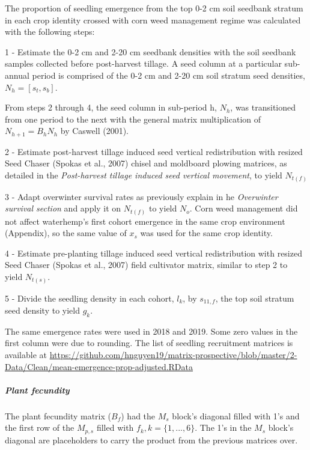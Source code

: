 \documentclass[
]{article}
\begin{document}
The proportion of seedling emergence from the top 0-2 cm soil seedbank stratum in each crop identity crossed with corn weed management regime was calculated with the following steps:

1 - Estimate the 0-2 cm and 2-20 cm seedbank densities with the soil seedbank samples collected before post-harvest tillage. A seed column at a particular sub-annual period is comprised of the 0-2 cm and 2-20 cm soil stratum seed densities, \(N_h = [s_t, s_b]\).

From steps 2 through 4, the seed column in sub-period h, \(N_h\), was transitioned from one period to the next with the general matrix multiplication of \(N_{h+1} = B_hN_h\) by Caswell (2001).

2 - Estimate post-harvest tillage induced seed vertical redistribution with resized Seed Chaser (Spokas et al., 2007) chisel and moldboard plowing matrices, as detailed in the \emph{Post-harvest tillage induced seed vertical movement}, to yield \(N_{t(f)}\)

3 - Adapt overwinter survival rates as previously explain in he \emph{Overwinter survival section} and apply it on \(N_{t(f)}\) to yield \(N_o\). Corn weed management did not affect waterhemp's first cohort emergence in the same crop environment (Appendix), so the same value of \(x_s\) was used for the same crop identity.

4 - Estimate pre-planting tillage induced seed vertical redistribution with resized Seed Chaser (Spokas et al., 2007) field cultivator matrix, similar to step 2 to yield \(N_{t(s)}\).

5 - Divide the seedling density in each cohort, \(l_k\), by \(s_{11,f}\), the top soil stratum seed density to yield \(g_k\).

The same emergence rates were used in 2018 and 2019. Some zero values in the first column were due to rounding. The list of seedling recruitment matrices is available at \url{https://github.com/hnguyen19/matrix-prospective/blob/master/2-Data/Clean/mean-emergence-prop-adjusted.RData}

\hypertarget{plant-fecundity}{%
\subparagraph*{Plant fecundity}\label{plant-fecundity}}

The plant fecundity matrix (\(B_f\)) had the \(M_s\) block's diagonal filled with 1's and the first row of the \(M_{p,s}\) filled with \(f_k, k = \{1,...,6\}\). The 1's in the \(M_s\) block's diagonal are placeholders to carry the product from the previous matrices over.
\end{document}
